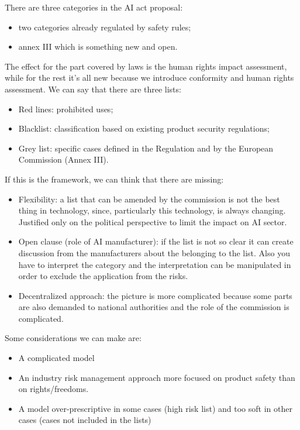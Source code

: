 There are three categories in the AI act proposal:
\begin{itemize}
    \item two categories already regulated by safety rules;
    \item annex III which is something new and open.
\end{itemize}
The effect for the part covered by laws is the human rights impact assessment, while for the rest it's all new because we introduce conformity and human rights assessment.
We can say that there are three lists:
\begin{itemize}
    \item Red lines: prohibited uses;
    \item Blacklist: classification based on existing product security regulations;
    \item Grey list: specific cases defined in the Regulation and by the European Commission (Annex III).
\end{itemize}
If this is the framework, we can think that there are missing:
\begin{itemize}
    \item Flexibility: a list that can be amended by the commission is not the best thing in technology, since, particularly this technology, is always changing. Justified only on the political perspective to limit the impact on AI sector.
    \item Open clause (role of AI manufacturer): if the list is not so clear it can create discussion from the manufacturers about the belonging to the list. Also you have to interpret the category and the interpretation can be manipulated in order to exclude the application from the risks. 
    \item Decentralized approach: the picture is more complicated because some parts are also demanded to national authorities and the role of the commission is complicated.
\end{itemize}
Some considerations we can make are:
\begin{itemize}
    \item A complicated model
    \item An industry risk management approach more focused on product safety than on rights/freedoms.
    \item A model over-prescriptive in some cases (high risk list) and too soft in other cases (cases not included in the lists)
\end{itemize}

